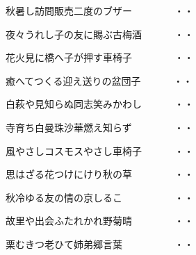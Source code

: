 \vspace{0.6cm}
\begin{shiika}秋暑し訪問販売二度のブザー　　　　
\hfill{・・}\end{shiika}
\vspace{0.6cm}
\begin{shiika}夜々うれし子の友に賜ぶ古梅酒　　　
\hfill{・・}\end{shiika}
\vspace{0.6cm}
\begin{shiika}花火見に橋へ子が押す車椅子　　　　
\hfill{・・}\end{shiika}
\vspace{0.6cm}
\begin{shiika}癒へてつくる迎え送りの盆団子　　　
\hfill{・・}\end{shiika}
\vspace{0.6cm}
\begin{shiika}白萩や見知らぬ同志笑みかわし　　　
\hfill{・・}\end{shiika}
\vspace{0.6cm}
\begin{shiika}寺育ち白曼珠沙華燃え知らず　　　　
\hfill{・・}\end{shiika}
\vspace{0.6cm}
\begin{shiika}風やさしコスモスやさし車椅子　　　
\hfill{・・}\end{shiika}
\vspace{0.6cm}
\begin{shiika}思はざる花つけにけり秋の草　　　　
\hfill{・・}\end{shiika}
\vspace{0.6cm}
\begin{shiika}秋冷ゆる友の情の京しるこ　　　　　
\hfill{・・}\end{shiika}
\vspace{0.6cm}
\begin{shiika}故里や出会ふたれかれ野菊晴　　　　
\hfill{・・}\end{shiika}
\vspace{0.6cm}
\begin{shiika}栗むきつ老ひて姉弟郷言葉　　　　　
\hfill{・・}\end{shiika}
